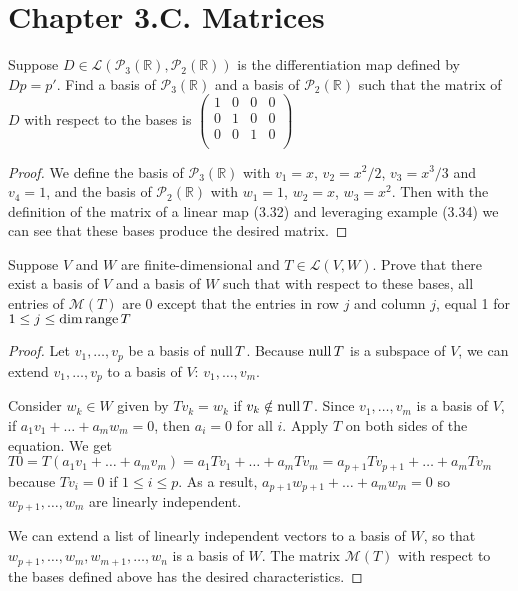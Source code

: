 \section*{Chapter 3.C. Matrices}


\begin{exercise}{2}
 Suppose $D\in\mathcal{L}(\mathcal{P}_{3}(\mathbb{R}), \mathcal{P}_{2}(\mathbb{R}))$ is the differentiation map defined by $Dp=p'$. Find a basis of $\mathcal{P}_{3}(\mathbb{R})$ and a basis of $\mathcal{P}_{2}(\mathbb{R})$ such that the matrix of $D$ with respect to the bases is 
 $\begin{pmatrix}
 1 & 0 & 0 & 0\\
 0 & 1 & 0 & 0\\
 0 & 0 & 1 & 0\\
 \end{pmatrix}$
\end{exercise}
\begin{proof}
 We define the basis of $\mathcal{P}_{3}(\mathbb{R})$ with $v_{1}=x$, $v_{2}=x^{2}/2$, $v_{3}=x^{3}/3$ and $v_{4}=1$, and the basis of $\mathcal{P}_{2}(\mathbb{R})$ with $w_{1}=1$, $w_{2}=x$, $w_{3}=x^{2}$. Then with the definition of the matrix of a linear map (3.32) and leveraging example (3.34) we can see that these bases produce the desired matrix.
\end{proof}


\begin{exercise}{3}
 Suppose $V$ and $W$ are finite-dimensional and $T\in\mathcal{L}(V,W)$. Prove that there exist a basis of $V$ and a basis of $W$ such that with respect to these bases, all entries of $\mathcal{M}(T)$ are 0 except that the entries in row $j$ and column $j$, equal 1 for $1\leq j\leq \dim\operatorname*{range} T$
\end{exercise}
\begin{proof}
 Let $v_{1},\dots, v_{p}$ be a basis of $\operatorname*{null} T$. Because $\operatorname*{null} T$ is a subspace of $V$, we can extend $v_{1},\dots, v_{p}$ to a basis of $V$: $v_{1},\dots, v_{m}$. 
 
 Consider $w_{k}\in W$ given by $Tv_{k}=w_{k}$ if $v_{k}\notin\operatorname*{null} T$. Since $v_{1},\dots,v_{m}$ is a basis of $V$, if $a_{1}v_{1}+\dots+a_{m}w_{m} = 0$, then $a_{i}=0$ for all $i$. Apply $T$ on both sides of the equation. We get $T0 = T(a_{1}v_{1}+\dots+a_{m}v_{m}) = a_{1}Tv_{1}+\dots+a_{m}Tv_{m} = a_{p+1}Tv_{p+1}+\dots+a_{m}Tv_{m}$ because $Tv_{i}=0$ if $1\leq i\leq p$. As a result, $a_{p+1}w_{p+1}+\dots+a_{m}w_{m}=0$ so $w_{p+1},\dots,w_{m}$ are linearly independent.
 
 We can extend a list of linearly independent vectors to a basis of $W$, so that $w_{p+1},\dots,w_{m}, w_{m+1},\dots, w_{n}$ is a basis of $W$. The matrix $\mathcal{M}(T)$ with respect to the bases defined above has the desired characteristics.
\end{proof}


